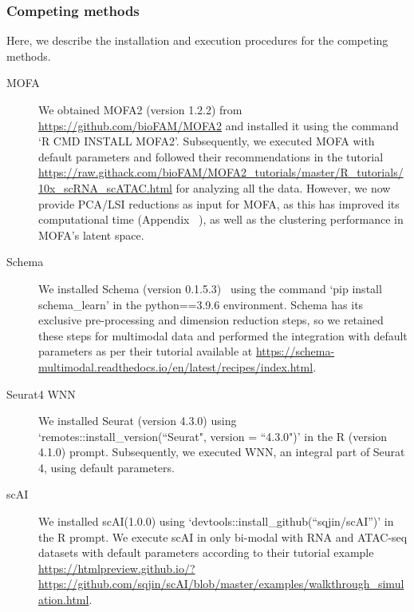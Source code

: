 \subsubsection{Competing methods}
\label{MOJITOO:exp:methods}
Here, we describe the installation and execution procedures for the competing methods.
\begin{description}
    \item[MOFA] 
    We obtained MOFA2 (version 1.2.2)\citep{tewari2017mofa} from \href{https://github.com/bioFAM/MOFA2}{https://github.com/bioFAM/MOFA2} and installed it using the command `R CMD INSTALL MOFA2'. Subsequently, we executed MOFA with default parameters and followed their recommendations in the tutorial \url{https://raw.githack.com/bioFAM/MOFA2_tutorials/master/R_tutorials/10x_scRNA_scATAC.html} for analyzing all the data. However, we now provide PCA/LSI reductions as input for MOFA, as this has improved its computational time (Appendix ~), as well as the clustering performance in MOFA's latent space.
    
    \item[Schema]
    We installed Schema (version 0.1.5.3)~\citep{singh2021schema} using the command `pip install schema\_learn' in the python==3.9.6 environment. Schema has its exclusive pre-processing and dimension reduction steps, so we retained these steps for multimodal data and performed the integration with default parameters as per their tutorial available at \url{https://schema-multimodal.readthedocs.io/en/latest/recipes/index.html}.
    
    \item[Seurat4 WNN]
    We installed Seurat (version 4.3.0) using `remotes::install\_version(``Seurat", version = ``4.3.0")' in the R (version 4.1.0) prompt. Subsequently, we executed WNN, an integral part of Seurat 4, using default parameters. 
    
    \item[scAI]
    We installed scAI(1.0.0) using `devtools::install\_github(``sqjin/scAI'')' in the R prompt. We execute scAI in only bi-modal with RNA and ATAC-seq datasets with default parameters according to their tutorial example \url{https://htmlpreview.github.io/?https://github.com/sqjin/scAI/blob/master/examples/walkthrough_simulation.html}.
    

\end{description}
